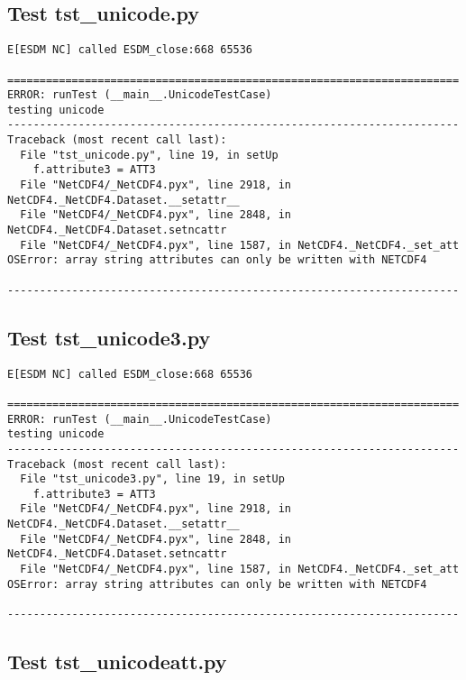 \subsection{Test tst\_unicode.py}

\begin{verbatim}
E[ESDM NC] called ESDM_close:668 65536

======================================================================
ERROR: runTest (__main__.UnicodeTestCase)
testing unicode
----------------------------------------------------------------------
Traceback (most recent call last):
  File "tst_unicode.py", line 19, in setUp
    f.attribute3 = ATT3
  File "NetCDF4/_NetCDF4.pyx", line 2918, in NetCDF4._NetCDF4.Dataset.__setattr__
  File "NetCDF4/_NetCDF4.pyx", line 2848, in NetCDF4._NetCDF4.Dataset.setncattr
  File "NetCDF4/_NetCDF4.pyx", line 1587, in NetCDF4._NetCDF4._set_att
OSError: array string attributes can only be written with NETCDF4

----------------------------------------------------------------------
\end{verbatim}

\subsection{Test tst\_unicode3.py}

\begin{verbatim}
E[ESDM NC] called ESDM_close:668 65536

======================================================================
ERROR: runTest (__main__.UnicodeTestCase)
testing unicode
----------------------------------------------------------------------
Traceback (most recent call last):
  File "tst_unicode3.py", line 19, in setUp
    f.attribute3 = ATT3
  File "NetCDF4/_NetCDF4.pyx", line 2918, in NetCDF4._NetCDF4.Dataset.__setattr__
  File "NetCDF4/_NetCDF4.pyx", line 2848, in NetCDF4._NetCDF4.Dataset.setncattr
  File "NetCDF4/_NetCDF4.pyx", line 1587, in NetCDF4._NetCDF4._set_att
OSError: array string attributes can only be written with NETCDF4

----------------------------------------------------------------------
\end{verbatim}

\subsection{Test tst\_unicodeatt.py}

